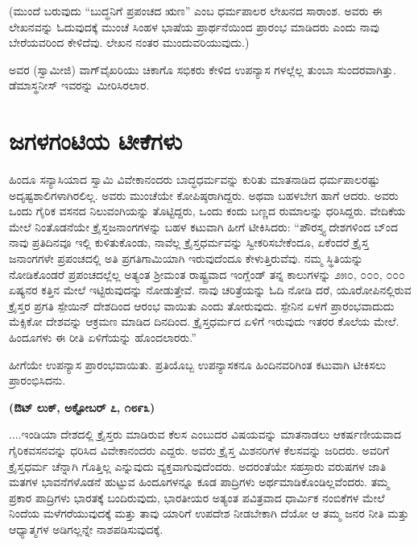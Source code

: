 (ಮುಂದೆ ಬರುವುದು “ಬುದ್ಧನಿಗೆ ಪ್ರಪಂಚದ ಋಣ” ಎಂಬ ಧರ್ಮಪಾಲರ ಲೇಖನದ ಸಾರಾಂಶ. ಅವರು ಈ ಲೇಖನವನ್ನು ಓದುವುದಕ್ಕೆ ಮುಂಚೆ ಸಿಂಹಳ ಭಾಷೆಯ ಪ್ರಾರ್ಥನೆಯಿಂದ ಪ್ರಾರಂಭ ಮಾಡಿದರು ಎಂದು ನಾವು ಬೇರೆಯವರಿಂದ ಕೇಳಿದೆವು. ಲೇಖನ ನಂತರ ಮುಂದುವರಿಯುವುದು.)

ಅವರ (ಸ್ವಾಮೀಜಿ) ವಾಗ್​ವೈಖರಿಯು ಚಿಕಾಗೊ ಸಭಿಕರು ಕೇಳಿದ ಉಪನ್ಯಾಸ ಗಳಲ್ಲೆಲ್ಲ ತುಂಬಾ ಸುಂದರವಾಗಿತ್ತು. ಡೆಮಾಸ್ಥನೀಸ್​ ಇವರನ್ನು ಮೀರಿಸಿರಲಾರ.


\section{ಜಗಳಗಂಟಿಯ ಟೀಕೆಗಳು}

ಹಿಂದೂ ಸನ್ಯಾಸಿಯಾದ ಸ್ವಾಮಿ ವಿವೇಕಾನಂದರು ಬಾದ್ಧಧರ್ಮವನ್ನು ಕುರಿತು ಮಾತನಾಡಿದ ಧರ್ಮಪಾಲರಷ್ಟು ಅದೃಷ್ಟಶಾಲಿಗಳಾಗಿರಲಿಲ್ಲ. ಅವರು ಮುಂಚೆಯೇ ಕೋಪಿಷ್ಠರಾಗಿದ್ದರು. ಅಥವಾ ಬಹಳಬೇಗ ಹಾಗೆ ಆದರು. ಅವರು ಒಂದು ಗೈರಿಕ ವಸನದ ನಿಲುವಂಗಿಯನ್ನು ತೊಟ್ಟಿದ್ದರು, ಒಂದು ಕಂದು ಬಣ್ಣದ ರುಮಾಲನ್ನು ಧರಿಸಿದ್ದರು. ವೇದಿಕೆಯ ಮೇಲೆ ನಿಂತೊಡನೆಯೇ ಕ್ರೈಸ್ತಜನಾಂಗಗಳನ್ನು ಬಹಳ ಕಟುವಾಗಿ ಹೀಗೆ ಟೀಕಿಸಿದರು: “ಪೌರಸ್ತ್ಯ ದೇಶಗಳಿಂದ ಬ್ಂದ ನಾವು ಪ್ರತಿದಿನವೂ ಇಲ್ಲಿ ಕುಳಿತುಕೊಂಡು, ನಾವೆಲ್ಲ ಕ್ರೈಸ್ತಧರ್ಮವನ್ನು ಸ್ವೀಕರಿಸಬೇಕೆಂದೂ, ಏಕೆಂದರೆ ಕ್ರೈಸ್ತ ಜನಾಂಗಗಳೇ ಪ್ರಪಂಚದಲ್ಲಿ ಅತಿ ಪ್ರಗತಿಗಾಮಿಯಾಗಿ ಇರುವುದೆಂದೂ ಕೇಳುತ್ತಿರುವೆವು. ನಮ್ಮ ಸ್ಥಿತಿಯನ್ನು ನೋಡಿಕೊಂಡರೆ ಪ್ರಪಂಚದಲ್ಲೆಲ್ಲ ಅತ್ಯಂತ ಶ‍್ರೀಮಂತ ರಾಷ್ಟ್ರವಾದ ಇಂಗ್ಲೆಂಡ್​ ತನ್ನ ಕಾಲುಗಳನ್ನು ೨೫೦, ೦೦೦, ೦೦೦ ಏಷ್ಯನರ ಕತ್ತಿನ ಮೇಲೆ ಇಟ್ಟಿರುವುದನ್ನು ನೋಡುತ್ತೇವೆ. ನಾವು ಚರಿತ್ರೆಯನ್ನು ಓದಿ ನೋಡಿ ದರೆ, ಯೂರೋಪಿನಲ್ಲಿರುವ ಕ್ರೈಸ್ತರ ಪ್ರಗತಿ ಸ್ಪೇಯಿನ್​ ದೇಶದಿಂದ ಆರಂಭ ವಾಯಿತು ಎಂದು ತೋರುವುದು. ಸ್ಪೇನಿನ ಏಳಗೆ ಪ್ರಾರಂಭವಾದುದು ಮೆಕ್ಸಿಕೋ ದೇಶವನ್ನು ಆಕ್ರಮಣ ಮಾಡಿದ ದಿನದಿಂದ. ಕ್ರೈಸ್ತಧರ್ಮದ ಏಳಿಗೆ ಇರುವುದು ಇತರರ ಕೊಲೆಯ ಮೇಲೆ. ಹಿಂದೂಗಳು ಈ ರೀತಿ ಏಳಿಗೆಯನ್ನು ಹೊಂದಲಾರರು.”

ಹೀಗೆಯೇ ಉಪನ್ಯಾಸ ಪ್ರಾರಂಭವಾಯಿತು. ಪ್ರತಿಯೊಬ್ಬ ಉಪನ್ಯಾಸಕನೂ ಹಿಂದಿನವರಿಗಿಂತ ಕಟುವಾಗಿ ಟೀಕಿಸಲು ಪ್ರಾರಂಭಿಸಿದನು.

\delimiter

\begin{center}
\textbf{(ಔಟ್​ ಲುಕ್​, ಅಕ್ಟೋಬರ್​ ೭, ೧೮೯೩)}
\end{center}

....ಇಂಡಿಯಾ ದೇಶದಲ್ಲಿ ಕ್ರೈಸ್ತರು ಮಾಡಿರುವ ಕೆಲಸ ಎಂಬುದರ ವಿಷಯವನ್ನು ಮಾತನಾಡಲು ಆಕರ್ಷಣೀಯವಾದ ಗೈರಿಕವಸನವನ್ನು ಧರಿಸಿದ ವಿವೇಕಾನಂದರು ಎದ್ದರು. ಅವರು ಕ್ರೈಸ್ತ ಮಿಶನರಿಗಳ ಕೆಲಸವನ್ನು ಜರಿದರು. ಅವರಿಗೆ ಕ್ರೈಸ್ತಧರ್ಮ ಚೆನ್ನಾಗಿ ಗೊತ್ತಿಲ್ಲ ಎನ್ನುವುದು ವ್ಯಕ್ತವಾಗುವುದೆಂದರು. ಅದರಂತೆಯೇ ಸಹಸ್ರಾರು ವರುಷಗಳ ಜಾತಿ ಮತಗಳ ಭಾವನೆಗಳೊಡನೆ ಹುಟ್ಟುವ ಹಿಂದೂಗಳನ್ನೂ ಕೂಡ ಪಾದ್ರಿಗಳು ಅರ್ಥಮಾಡಿಕೊಂಡಿಲ್ಲವೆಂದರು. ತಮ್ಮ ಪ್ರಕಾರ ಪಾದ್ರಿಗಳು ಭಾರತಕ್ಕೆ ಬಂದಿರುವುದು, ಭಾರತೀಯರ ಅತ್ಯಂತ ಪವಿತ್ರವಾದ ಧಾರ್ಮಿಕ ನಂಬಿಕೆಗಳ ಮೇಲೆ ನಿಂದೆಯ ಮಳೆಗರೆಯುವುದಕ್ಕೆ ಮತ್ತು ತಾವು ಯಾರಿಗೆ ಉಪದೇಶ ನೀಡಬೇಕಾಗಿ ದೆಯೋ ಆ ತಮ್ಮ ಜನರ ನೀತಿ ಮತ್ತು ಆಧ್ಯಾತ್ಮಗಳ ಅಡಿಗಲ್ಲನ್ನೇ ನಾಶಪಡಿಸುವುದಕ್ಕೆ.

\delimiter

